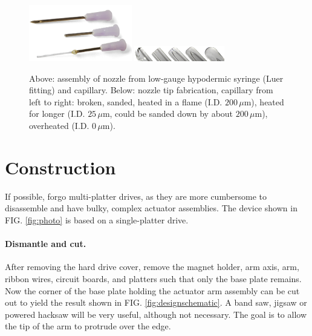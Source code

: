 \documentclass[aip,rsi,reprint,graphicx]{revtex4-1} %
\begin{document}
\begin{figure}
\centering
\includegraphics[width=0.4\textwidth]{hdg_images/needles.png}
\includegraphics[width=0.35\textwidth]{hdg_images/needletips.png}
\caption{Above: assembly of nozzle from
low-gauge hypodermic syringe (Luer fitting) and capillary. Below: nozzle tip
fabrication, capillary from left to right: broken, sanded, heated in a flame (I.D.
$200\,\mu$m), heated for longer (I.D. $25\,\mu$m, could be sanded down by about
$200\,\mu$m), overheated (I.D. $0\,\mu$m). \label{fig:needles}}
\end{figure}


\section{Construction}
If possible, forgo multi-platter drives, as they are more cumbersome to disassemble and have
bulky, complex actuator assemblies. The device shown in FIG. \ref{fig:photo}
is based on a single-platter drive.

\paragraph{Dismantle and cut.} After removing the hard drive cover, remove
the magnet holder, arm axis, arm, ribbon wires, circuit boards, and platters
such that only the base plate remains. Now the corner of the base plate holding
the actuator arm assembly can be cut out to yield the result shown in FIG.
\ref{fig:designschematic}. A band saw, jigsaw or powered hacksaw will be very
useful, although not necessary. The goal is to allow the tip of the arm to
protrude over the edge.
\end{document}
